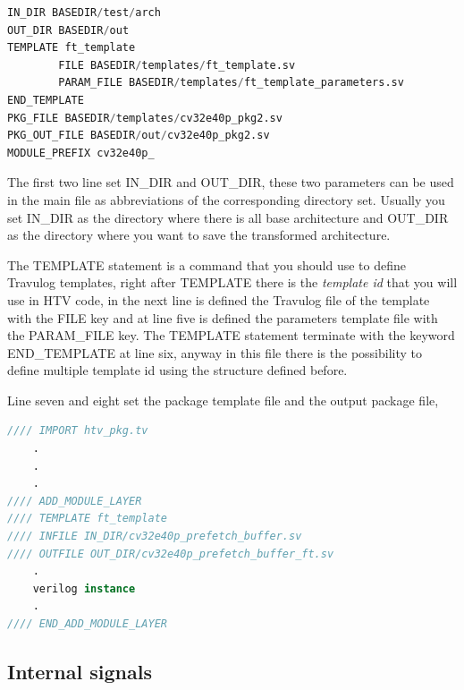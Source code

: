 {{{            \begin{lstlisting}[basicstyle=\ttfamily\scriptsize, language=Verilog, caption=Introduction of cv32e40p if stage, label=lst:htvpkg]
IN_DIR BASEDIR/test/arch
OUT_DIR BASEDIR/out
TEMPLATE ft_template
        FILE BASEDIR/templates/ft_template.sv
        PARAM_FILE BASEDIR/templates/ft_template_parameters.sv
END_TEMPLATE
PKG_FILE BASEDIR/templates/cv32e40p_pkg2.sv
PKG_OUT_FILE BASEDIR/out/cv32e40p_pkg2.sv
MODULE_PREFIX cv32e40p_
            \end{lstlisting}
            
            The first two line set IN\_DIR and OUT\_DIR, these two parameters can be used in the main file as abbreviations of the corresponding directory set. Usually you set IN\_DIR as the directory where there is all base architecture and OUT\_DIR as the directory where you want to save the transformed architecture.
            
            The TEMPLATE statement is a command that you should use to define Travulog templates, right after TEMPLATE there is the \textit{template id} that you will use in HTV code, in the next line is defined the Travulog file of the template with the FILE key and at line five is defined the parameters template file with the PARAM\_FILE key. The TEMPLATE statement terminate with the keyword END\_TEMPLATE at line six, anyway in this file there is the possibility to define multiple template id using the structure defined before.
            
            
            Line seven and eight set the package template file and the output package file,  
            
            \begin{lstlisting}[basicstyle=\ttfamily\scriptsize, language=Verilog, caption=Introduction of cv32e40p if stage, label=lst:htvpkg2]
//// IMPORT htv_pkg.tv
    .
    .
    .
//// ADD_MODULE_LAYER 
//// TEMPLATE ft_template 
//// INFILE IN_DIR/cv32e40p_prefetch_buffer.sv
//// OUTFILE OUT_DIR/cv32e40p_prefetch_buffer_ft.sv
    .
    verilog instance
    .
//// END_ADD_MODULE_LAYER
            \end{lstlisting}
        
        }%
        \subsection{Internal signals}{
            \label{InternalSignals}
        
}}}

